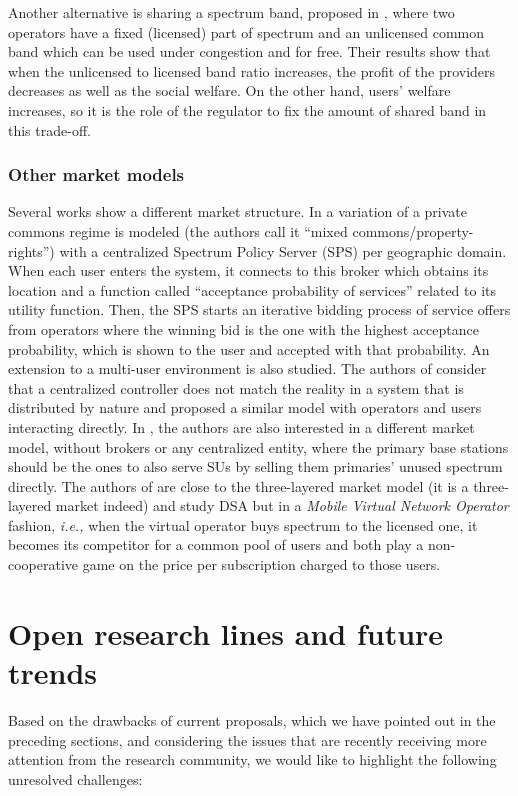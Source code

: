 Another alternative is sharing a spectrum band, proposed in \cite{ref:Maille2009}, where two operators have a fixed (licensed) part of spectrum and an unlicensed common band which can be used under congestion and for free. Their results show that when the unlicensed to licensed band ratio increases, the profit of the providers decreases as well as the social welfare. On the other hand, users' welfare increases, so it is the role of the regulator to fix the amount of shared band in this trade-off.

\subsubsection{Other market models}
Several works show a different market structure. In \cite{ref:Illeri2005} a variation of a private commons regime is modeled (the authors call it ``mixed commons/property-rights'') with a centralized Spectrum Policy Server (SPS) per geographic domain. When each user enters the system, it connects to this broker which obtains its location and a function called ``acceptance probability of services'' related to its utility function. Then, the SPS starts an iterative bidding process of service offers from operators where the winning bid is the one with the highest acceptance probability, which is shown to the user and accepted with that probability. An extension to a multi-user environment is also studied. The authors of \cite{ref:Xing2007} consider that a centralized controller does not match the reality in a system that is distributed by nature and proposed a similar model with operators and users interacting directly. In \cite{ref:Dixit2010}, the authors are also interested in a different market model, without brokers or any centralized entity, where the primary base stations should be the ones to also serve SUs by selling them primaries' unused spectrum directly. The authors of \cite{ref:Guijarro2011} are close to the three-layered market model (it is a three-layered market indeed) and study DSA but in a \textit{Mobile Virtual Network Operator} fashion, \textit{i.e.,} when the virtual operator buys spectrum to the licensed one, it becomes its competitor for a common pool of users and both play a non-cooperative game on the price per subscription charged to those users.


\section{Open research lines and future trends}
\label{sec:Open}
Based on the drawbacks of current proposals, which we have pointed out in the preceding sections, and considering the issues that are recently receiving more attention from the research community, we would like to highlight the following unresolved challenges: 
